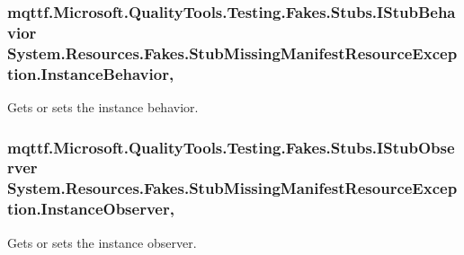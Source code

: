 \hypertarget{class_system_1_1_resources_1_1_fakes_1_1_stub_missing_manifest_resource_exception_a3f257bdb6bf13782bcdbfbe7c82836d3}{
\subsubsection[{Instance\-Behavior}]{\setlength{\rightskip}{0pt plus 5cm}mqttf.\-Microsoft.\-Quality\-Tools.\-Testing.\-Fakes.\-Stubs.\-I\-Stub\-Behavior System.\-Resources.\-Fakes.\-Stub\-Missing\-Manifest\-Resource\-Exception.\-Instance\-Behavior\hspace{0.3cm}{\ttfamily [get]}, {\ttfamily [set]}}}\label{class_system_1_1_resources_1_1_fakes_1_1_stub_missing_manifest_resource_exception_a3f257bdb6bf13782bcdbfbe7c82836d3}


Gets or sets the instance behavior.

\hypertarget{class_system_1_1_resources_1_1_fakes_1_1_stub_missing_manifest_resource_exception_a42d1c0195983e683a0acc12ac69f9b42}{
\subsubsection[{Instance\-Observer}]{\setlength{\rightskip}{0pt plus 5cm}mqttf.\-Microsoft.\-Quality\-Tools.\-Testing.\-Fakes.\-Stubs.\-I\-Stub\-Observer System.\-Resources.\-Fakes.\-Stub\-Missing\-Manifest\-Resource\-Exception.\-Instance\-Observer\hspace{0.3cm}{\ttfamily [get]}, {\ttfamily [set]}}}\label{class_system_1_1_resources_1_1_fakes_1_1_stub_missing_manifest_resource_exception_a42d1c0195983e683a0acc12ac69f9b42}


Gets or sets the instance observer.

